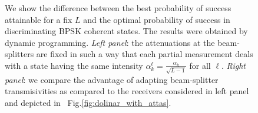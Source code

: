 \begin{figure}[t!]
\begin{subfigure}[b]{0.49\textwidth}
        \caption{}
        \label{fig:dpre2}
    \end{subfigure}
    \caption{We show the difference between the best probability of success attainable for a fix $L$ and the optimal probability of success in discriminating BPSK coherent states. The results were obtained by dynamic programming. \textit{Left panel}: the attenuations at the beam-splitters are fixed in such a way that each partial measurement deals with a state having the same intensity $\alpha^{\ell}_k=\frac{\alpha_k}{\sqrt{L-1}}$ for all $\ell$. \textit{Right panel}: we compare the advantage of adapting beam-splitter transmisivities as compared to the receivers considered in left panel and depicted in ~Fig.\ref{fig:dolinar_with_attas}.}
    \label{fig:dp_resu}
\end{figure}




